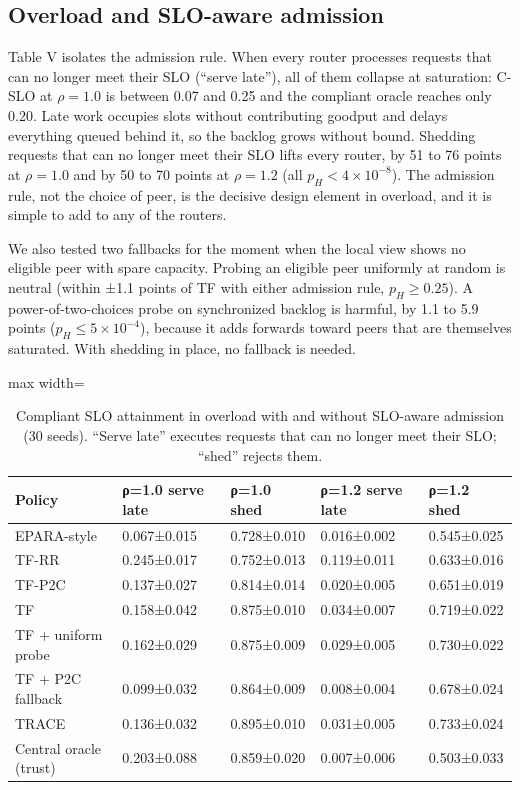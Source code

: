 \documentclass[journal]{IEEEtran}
\begin{document}
\subsection{Overload and SLO-aware admission}

Table V isolates the admission rule. When every router processes requests that can no longer meet their SLO (``serve late''), all of them collapse at saturation: C-SLO at \(\rho=1.0\) is between 0.07 and 0.25 and the compliant oracle reaches only 0.20. Late work occupies slots without contributing goodput and delays everything queued behind it, so the backlog grows without bound. Shedding requests that can no longer meet their SLO lifts every router, by 51 to 76 points at \(\rho=1.0\) and by 50 to 70 points at \(\rho=1.2\) (all \(p_H<4\times10^{-8}\)). The admission rule, not the choice of peer, is the decisive design element in overload, and it is simple to add to any of the routers.

We also tested two fallbacks for the moment when the local view shows no eligible peer with spare capacity. Probing an eligible peer uniformly at random is neutral (within ±1.1 points of TF with either admission rule, \(p_H\ge0.25\)). A power-of-two-choices probe on synchronized backlog is harmful, by 1.1 to 5.9 points (\(p_H\le5\times10^{-4}\)), because it adds forwards toward peers that are themselves saturated. With shedding in place, no fallback is needed.

\begin{table}[!t]
\centering
\caption{Compliant SLO attainment in overload with and without SLO-aware admission (30 seeds). ``Serve late'' executes requests that can no longer meet their SLO; ``shed'' rejects them.}
\footnotesize
\begin{adjustbox}{max width=\columnwidth}
\begin{tabular}{lllll}
\toprule
Policy & ρ=1.0 serve late & ρ=1.0 shed & ρ=1.2 serve late & ρ=1.2 shed \\
\midrule
EPARA-style & 0.067±0.015 & 0.728±0.010 & 0.016±0.002 & 0.545±0.025 \\
TF-RR & 0.245±0.017 & 0.752±0.013 & 0.119±0.011 & 0.633±0.016 \\
TF-P2C & 0.137±0.027 & 0.814±0.014 & 0.020±0.005 & 0.651±0.019 \\
TF & 0.158±0.042 & 0.875±0.010 & 0.034±0.007 & 0.719±0.022 \\
TF + uniform probe & 0.162±0.029 & 0.875±0.009 & 0.029±0.005 & 0.730±0.022 \\
TF + P2C fallback & 0.099±0.032 & 0.864±0.009 & 0.008±0.004 & 0.678±0.024 \\
TRACE & 0.136±0.032 & 0.895±0.010 & 0.031±0.005 & 0.733±0.024 \\
Central oracle (trust) & 0.203±0.088 & 0.859±0.020 & 0.007±0.006 & 0.503±0.033 \\
\bottomrule
\end{tabular}
\end{adjustbox}
\end{table}
\end{document}
